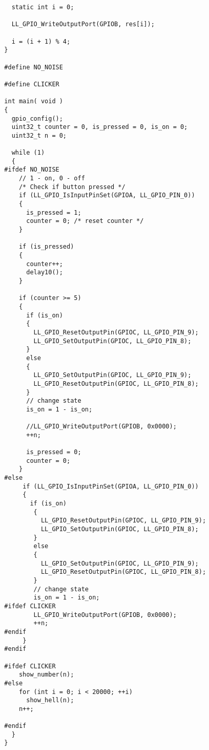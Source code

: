 \begin{verbatim}
    static int i = 0;
    
    LL_GPIO_WriteOutputPort(GPIOB, res[i]);
    
    i = (i + 1) % 4;
  }
  
  #define NO_NOISE
  
  #define CLICKER
  
  int main( void )
  { 
    gpio_config();
    uint32_t counter = 0, is_pressed = 0, is_on = 0;
    uint32_t n = 0;
    
    while (1)
    {
  #ifdef NO_NOISE
      // 1 - on, 0 - off
      /* Check if button pressed */
      if (LL_GPIO_IsInputPinSet(GPIOA, LL_GPIO_PIN_0))
      {
        is_pressed = 1; 
        counter = 0; /* reset counter */
      }
     
      if (is_pressed)
      {
        counter++;
        delay10();
      }
      
      if (counter >= 5)
      {
        if (is_on)
        {
          LL_GPIO_ResetOutputPin(GPIOC, LL_GPIO_PIN_9);
          LL_GPIO_SetOutputPin(GPIOC, LL_GPIO_PIN_8);
        }
        else
        {
          LL_GPIO_SetOutputPin(GPIOC, LL_GPIO_PIN_9);
          LL_GPIO_ResetOutputPin(GPIOC, LL_GPIO_PIN_8);
        }
        // change state
        is_on = 1 - is_on;
      
        //LL_GPIO_WriteOutputPort(GPIOB, 0x0000);
        ++n;
        
        is_pressed = 0;
        counter = 0;
      }
  #else
       if (LL_GPIO_IsInputPinSet(GPIOA, LL_GPIO_PIN_0)) 
       {
         if (is_on)
          {
            LL_GPIO_ResetOutputPin(GPIOC, LL_GPIO_PIN_9);
            LL_GPIO_SetOutputPin(GPIOC, LL_GPIO_PIN_8);
          }
          else
          {
            LL_GPIO_SetOutputPin(GPIOC, LL_GPIO_PIN_9);
            LL_GPIO_ResetOutputPin(GPIOC, LL_GPIO_PIN_8);
          }
          // change state
          is_on = 1 - is_on;
  #ifdef CLICKER
          LL_GPIO_WriteOutputPort(GPIOB, 0x0000);
          ++n;
  #endif
       }
  #endif
      
  #ifdef CLICKER
      show_number(n);
  #else
      for (int i = 0; i < 20000; ++i)
        show_hell(n);
      n++;
      
  #endif
    }
  }
  
  \end{verbatim}